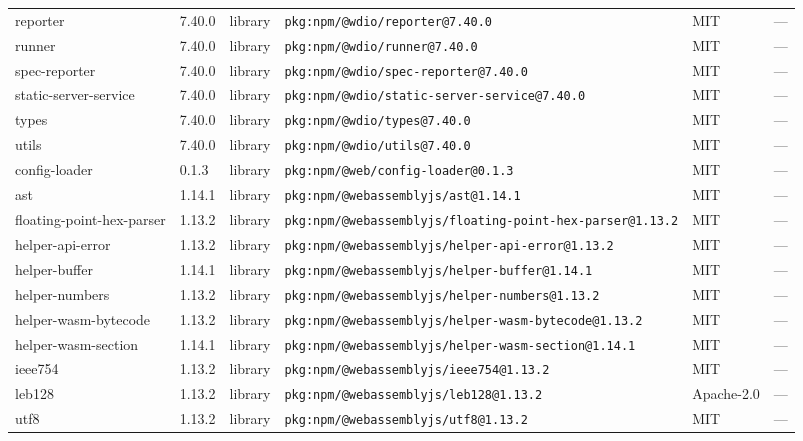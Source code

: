 \documentclass[11pt,a4paper]{article}
\begin{document}
\begin{longtable}{|p{4cm}|p{2cm}|p{1.6cm}|p{5cm}|p{1.5cm}|p{3.5cm}|}
\raggedright reporter & 7.40.0 & library & \small\texttt{pkg:npm/@wdio/reporter@7.40.0} & MIT & \small — \\
\raggedright runner & 7.40.0 & library & \small\texttt{pkg:npm/@wdio/runner@7.40.0} & MIT & \small — \\
\raggedright spec-reporter & 7.40.0 & library & \small\texttt{pkg:npm/@wdio/spec-reporter@7.40.0} & MIT & \small — \\
\raggedright static-server-service & 7.40.0 & library & \small\texttt{pkg:npm/@wdio/static-server-service@7.40.0} & MIT & \small — \\
\raggedright types & 7.40.0 & library & \small\texttt{pkg:npm/@wdio/types@7.40.0} & MIT & \small — \\
\raggedright utils & 7.40.0 & library & \small\texttt{pkg:npm/@wdio/utils@7.40.0} & MIT & \small — \\
\raggedright config-loader & 0.1.3 & library & \small\texttt{pkg:npm/@web/config-loader@0.1.3} & MIT & \small — \\
\raggedright ast & 1.14.1 & library & \small\texttt{pkg:npm/@webassemblyjs/ast@1.14.1} & MIT & \small — \\
\raggedright floating-point-hex-parser & 1.13.2 & library & \small\texttt{pkg:npm/@webassemblyjs/floating-point-hex-parser@1.13.2} & MIT & \small — \\
\raggedright helper-api-error & 1.13.2 & library & \small\texttt{pkg:npm/@webassemblyjs/helper-api-error@1.13.2} & MIT & \small — \\
\raggedright helper-buffer & 1.14.1 & library & \small\texttt{pkg:npm/@webassemblyjs/helper-buffer@1.14.1} & MIT & \small — \\
\raggedright helper-numbers & 1.13.2 & library & \small\texttt{pkg:npm/@webassemblyjs/helper-numbers@1.13.2} & MIT & \small — \\
\raggedright helper-wasm-bytecode & 1.13.2 & library & \small\texttt{pkg:npm/@webassemblyjs/helper-wasm-bytecode@1.13.2} & MIT & \small — \\
\raggedright helper-wasm-section & 1.14.1 & library & \small\texttt{pkg:npm/@webassemblyjs/helper-wasm-section@1.14.1} & MIT & \small — \\
\raggedright ieee754 & 1.13.2 & library & \small\texttt{pkg:npm/@webassemblyjs/ieee754@1.13.2} & MIT & \small — \\
\raggedright leb128 & 1.13.2 & library & \small\texttt{pkg:npm/@webassemblyjs/leb128@1.13.2} & Apache-2.0 & \small — \\
\raggedright utf8 & 1.13.2 & library & \small\texttt{pkg:npm/@webassemblyjs/utf8@1.13.2} & MIT & \small — \\

\end{longtable}
\end{document}
